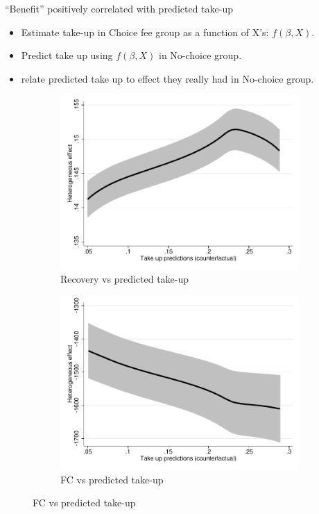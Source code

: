 \documentclass[9pt]{beamer}
\begin{document}
\begin{frame}{``Benefit'' positively correlated with predicted take-up}

\begin{itemize}
    \item Estimate take-up \alert{in Choice fee group} as a function of X's: $f(\beta,X)$.
    \item Predict take up using $f(\beta,X)$ in \alert{No-choice group}.
    \item relate predicted take up to effect they really had in \alert{No-choice group}.
\end{itemize}


\begin{figure}[H]
    \begin{center}
     \begin{subfigure}{0.45\textwidth}
        \caption{Recovery vs predicted take-up}
        \centering
        \includegraphics[width=\textwidth]{Figuras/takeup_he_pro_2_pago_frec_vol_fee_des_c.pdf}
    \end{subfigure}
     \begin{subfigure}{0.45\textwidth}
        \caption{FC vs predicted take-up}
        \centering
        \includegraphics[width=\textwidth]{Figuras/takeup_he_pro_2_pago_frec_vol_fee_fc_survey.pdf}
    \end{subfigure}
    \end{center}
    \end{figure}
    

\end{frame}
\end{document}
